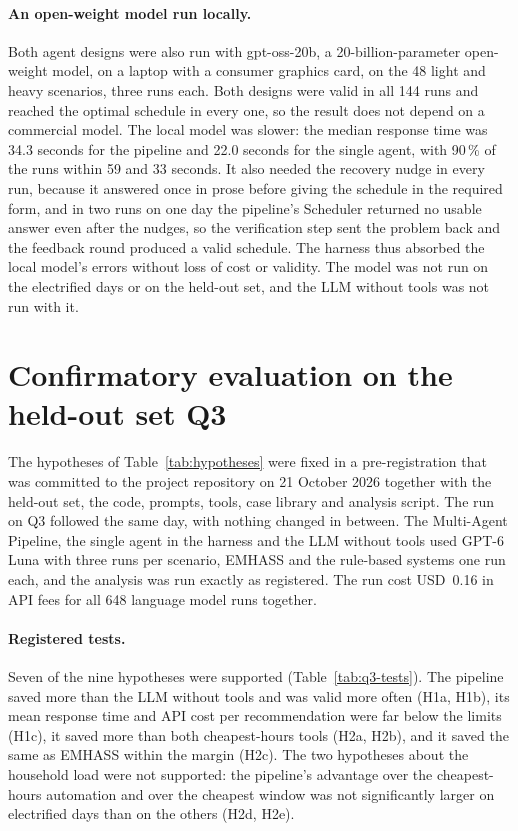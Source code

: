 \documentclass[12pt,a4paper]{report}
\begin{document}
\paragraph{An open-weight model run locally.} Both agent designs were
also run with gpt-oss-20b, a 20-billion-parameter open-weight model, on
a laptop with a consumer graphics card, on the 48 light and heavy
scenarios, three runs each. Both designs were valid in all 144 runs and
reached the optimal schedule in every one, so the result does not depend
on a commercial model. The local model was slower: the median response
time was 34.3 seconds for the pipeline and 22.0 seconds for the single
agent, with 90\,\% of the runs within 59 and 33 seconds. It also needed
the recovery nudge in every run, because it answered once in prose
before giving the schedule in the required form, and in two runs on one
day the pipeline's Scheduler returned no usable answer even after the
nudges, so the verification step sent the problem back and the feedback
round produced a valid schedule. The harness thus absorbed the local
model's errors without loss of cost or validity. The model was not run
on the electrified days or on the held-out set, and the LLM without
tools was not run with it.

\section{Confirmatory evaluation on the held-out set Q3}
\label{sec:confirmatory}

The hypotheses of Table~\ref{tab:hypotheses} were fixed in a
pre-registration that was committed to the project repository on
21 October 2026 together with the held-out set, the code, prompts,
tools, case library and analysis script. The run on Q3 followed the same
day, with nothing changed in between. The Multi-Agent Pipeline, the
single agent in the harness and the LLM without tools used GPT-6 Luna
with three runs per scenario, EMHASS and the rule-based systems one run
each, and the analysis was run exactly as registered. The run cost
USD~0.16 in API fees for all 648 language model runs together.

\paragraph{Registered tests.} Seven of the nine hypotheses were
supported (Table~\ref{tab:q3-tests}). The pipeline saved more than the
LLM without tools and was valid more often (H1a, H1b), its mean response
time and API cost per recommendation were far below the limits (H1c), it
saved more than both cheapest-hours tools (H2a, H2b), and it saved the
same as EMHASS within the margin (H2c). The two hypotheses about the
household load were not supported: the pipeline's advantage over the
cheapest-hours automation and over the cheapest window was not
significantly larger on electrified days than on the others (H2d,
H2e).
\end{document}

